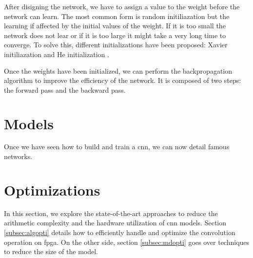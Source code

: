 After disigning the network, we have to assign a value to the weight before the network can learn. The most common form is random initiliazation but the learning if affected by the initial values of the weight. If it is too small the network does not lear or if it is too large it might take a very long time to converge. To solve this, different initializations have been proposed: Xavier initiliazation \cite{glorot_understanding_2010} and He initialization \cite{he_delving_2015}.

Once the weights have been initialized, we can perform the backpropagation algorithm to improve the efficiency of the network. It is composed of two steps: the forward pass and the backward pass.
%
%

%

%
%
\section{Models}
Once we have seen how to build and train a \acrshort{cnn}, we can now detail famous networks. 
%

%
%
\section{Optimizations}
%
%
In this section, we explore the state-of-the-art approaches to reduce the arithmetic complexity and the hardware utilization of \acrshort{cnn} models. Section \ref{subsec:algopti} details how to efficiently handle and optimize the convolution operation on \acrshort{fpga}. On the other side, section \ref{subsec:mdopti} goes over techniques to reduce the size of the model.
%

%

